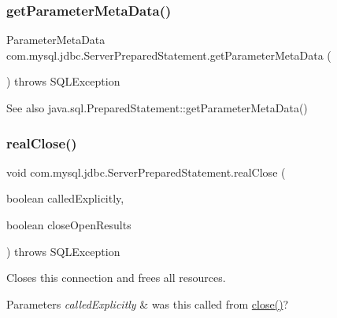 \subsubsection{\texorpdfstring{get\+Parameter\+Meta\+Data()}{getParameterMetaData()}}
{\footnotesize\ttfamily Parameter\+Meta\+Data com.\+mysql.\+jdbc.\+Server\+Prepared\+Statement.\+get\+Parameter\+Meta\+Data (\begin{DoxyParamCaption}{ }\end{DoxyParamCaption}) throws S\+Q\+L\+Exception}

\begin{DoxySeeAlso}{See also}
java.\+sql.\+Prepared\+Statement\+::get\+Parameter\+Meta\+Data() 
\end{DoxySeeAlso}
\mbox{\label{classcom_1_1mysql_1_1jdbc_1_1_server_prepared_statement_af12056e4aca4279abd972fbbba2f320f}} 
\subsubsection{\texorpdfstring{real\+Close()}{realClose()}}
{\footnotesize\ttfamily void com.\+mysql.\+jdbc.\+Server\+Prepared\+Statement.\+real\+Close (\begin{DoxyParamCaption}\item[{boolean}]{called\+Explicitly,  }\item[{boolean}]{close\+Open\+Results }\end{DoxyParamCaption}) throws S\+Q\+L\+Exception\hspace{0.3cm}{\ttfamily [protected]}}

Closes this connection and frees all resources.


\begin{DoxyParams}{Parameters}
{\em called\+Explicitly} & was this called from \mbox{\hyperlink{classcom_1_1mysql_1_1jdbc_1_1_server_prepared_statement_a2d447ecd02f6f318e320d5c33ebfa780}{close()}}?\\
\hline
\end{DoxyParams}

